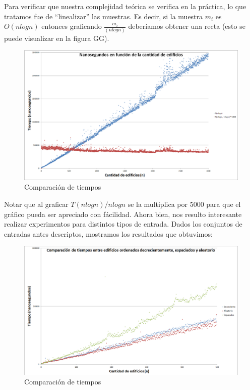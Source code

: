 Para verificar que nuestra complejidad teórica se verifica en la práctica, lo que tratamos fue de "`linealizar"' las muestras. Es decir, si la muestra $m_{i}$ es $O(n logn)$ entonces graficando $\frac{m_{i}}{(n logn)}$ deberíamos obtener una recta (esto se puede visualizar en la figura GG). 

\begin{figure}[H]
	\centering
	\includegraphics[scale=0.45]{Imagenes/Ej2/exp2_random.png}
	\caption{Comparación de tiempos}
	\label{fig:ej1_comple2}
\end{figure}
Notar que al graficar $T(n logn)/n logn$ se la multiplica por 5000 para que el gráfico pueda ser apreciado con fácilidad.
Ahora bien, nos resulto interesante realizar experimentos para distintos tipos de entrada. Dados los conjuntos de entradas antes descriptos, mostramos los resultados que obtuvimos:

\begin{figure}[H]
	\centering
	\includegraphics[scale=0.45]{Imagenes/Ej2/exp2_comparacion.png}
	\caption{Comparación de tiempos}
	\label{fig:ej1_comple2}
\end{figure}

